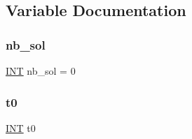 \subsection{Variable Documentation}
\mbox{\label{test_8_c_a0029b734487624c93c3a72d74a8f2bf9}} 
\subsubsection{\texorpdfstring{nb\+\_\+sol}{nb\_sol}}
{\footnotesize\ttfamily \mbox{\hyperlink{galois_8h_a09fddde158a3a20bd2dcadb609de11dc}{I\+NT}} nb\+\_\+sol = 0}

\mbox{\label{test_8_c_a4268f4fe222ffb119218a0199f5e1904}} 
\subsubsection{\texorpdfstring{t0}{t0}}
{\footnotesize\ttfamily \mbox{\hyperlink{galois_8h_a09fddde158a3a20bd2dcadb609de11dc}{I\+NT}} t0}

